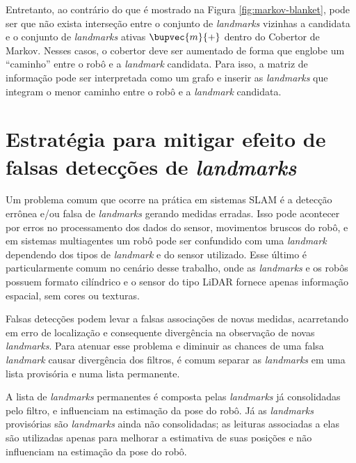 Entretanto, ao contrário do que é mostrado na Figura \ref{fig:markov-blanket}, 
pode ser que não exista interseção entre o conjunto de \textit{landmarks} 
vizinhas a candidata e o conjunto de \textit{landmarks} ativas $\bupvec{m}{+}$ 
dentro do Cobertor de Markov. Nesses casos, o cobertor deve ser aumentado de 
forma que englobe um ``caminho'' entre o robô e a \textit{landmark} candidata. 
Para isso, a matriz de informação pode ser interpretada como um grafo e inserir 
as \textit{landmarks} que integram o menor caminho entre o robô e a 
\textit{landmark} candidata.

\section{Estratégia para mitigar efeito de falsas detecções de \textit{landmarks}}
\label{sec:false-detection-handling-strategy}
Um problema comum que ocorre na prática em sistemas SLAM é a detecção 
errônea e/ou falsa de \textit{landmarks} gerando medidas erradas. Isso pode 
acontecer por erros no processamento dos dados do sensor, movimentos bruscos 
do robô, e em sistemas multiagentes um robô pode ser confundido com uma \textit{landmark} dependendo dos tipos de \textit{landmark} e do sensor utilizado. 
Esse último é particularmente comum no cenário desse trabalho, onde as \textit{landmarks} e os robôs possuem formato cilíndrico e o sensor do tipo LiDAR 
fornece apenas informação espacial, sem cores ou texturas.

Falsas detecções podem levar a falsas associações de novas medidas, 
acarretando em erro de localização e consequente divergência na 
observação de novas \textit{landmarks}. Para atenuar esse problema e 
diminuir as chances de uma falsa \textit{landmark} causar 
divergência dos filtros, é comum separar as \textit{landmarks} em uma lista provisória e numa lista permanente.

A lista de \textit{landmarks} permanentes é composta pelas 
\textit{landmarks} já consolidadas pelo filtro, e influenciam 
na estimação da pose do robô. Já as \textit{landmarks} 
provisórias são \textit{landmarks} ainda não consolidadas; as leituras 
associadas a elas são utilizadas apenas para melhorar a estimativa de 
suas posições e não influenciam na estimação da pose do robô.

